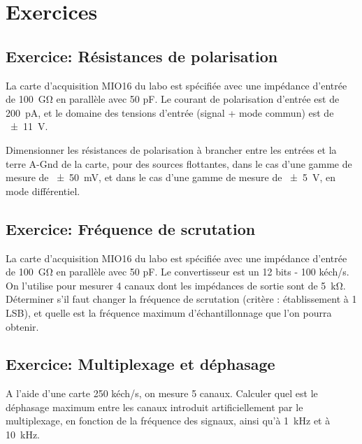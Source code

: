\pagebreak

\section{Exercices}

\subsection{Exercice: Résistances de polarisation}
La carte d'acquisition MIO16 du labo est spécifiée avec une impédance d'entrée de \SI{100}{\giga\ohm} en parallèle avec 50 pF. Le courant de polarisation d'entrée est de \SI{200}{\pico\ampere}, et le domaine des tensions d'entrée (signal + mode commun) est de \SI{\pm11}{\volt}.

Dimensionner les résistances de polarisation à brancher entre les entrées et la terre A-Gnd de la carte, pour des sources flottantes, dans le cas d'une gamme de mesure de \SI{\pm50}{\milli\volt}, et dans le cas d'une gamme de mesure de \SI{\pm5}{\volt}, en mode différentiel.

\subsection{Exercice: Fréquence de scrutation}
La carte d'acquisition MIO16 du labo est spécifiée avec une impédance d'entrée de \SI{100}{\giga\ohm} en parallèle avec 50 pF. Le convertisseur est un 12 bits - 100 kéch/s. On l'utilise pour mesurer 4 canaux dont les impédances de sortie sont de \SI{5}{\kilo\ohm}. Déterminer s'il faut changer la fréquence de scrutation (critère : établissement à 1 LSB), et quelle est la fréquence maximum d'échantillonnage que l'on pourra obtenir.

\subsection{Exercice: Multiplexage et déphasage}
A l'aide d'une carte 250 kéch/s, on mesure 5 canaux. Calculer quel est le déphasage maximum entre les canaux introduit artificiellement par le multiplexage, en fonction de la fréquence des signaux, ainsi qu'à \SI{1}{\kilo\hertz} et à \SI{10}{\kilo\hertz}.